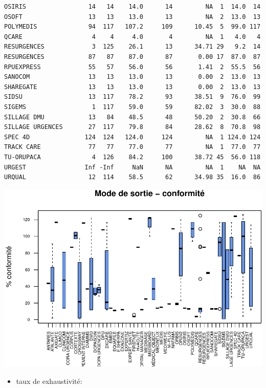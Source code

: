 \documentclass[]{article}
\begin{document}
\begin{verbatim}
OSIRIS                 14   14    14.0      14         NA  1  14.0  14
OSOFT                  13   13    13.0      13         NA  2  13.0  13
POLYMEDIS              94  117   107.2     109      10.45  5  99.0 117
QCARE                   4    4     4.0       4         NA  1   4.0   4
RESURGENCES             3  125    26.1      13      34.71 29   9.2  14
RESURGENCES            87   87    87.0      87       0.00 17  87.0  87
RPUEXPRESS             55   57    56.0      56       1.41  2  55.5  56
SANOCOM                13   13    13.0      13       0.00  2  13.0  13
SHAREGATE              13   13    13.0      13       0.00  2  13.0  13
SIDSU                  13  117    78.2      93      38.51  9  76.0  99
SIGEMS                  1  117    59.0      59      82.02  3  30.0  88
SILLAGE DMU            13   84    48.5      48      50.20  2  30.8  66
SILLAGE URGENCES       27  117    79.8      84      28.62  8  70.8  98
SPEC 4D               124  124   124.0     124         NA  1 124.0 124
TRACK CARE             77   77    77.0      77         NA  1  77.0  77
TU-ORUPACA              4  126    84.2     100      38.72 45  56.0 118
URGEST                Inf -Inf     NaN      NA         NA  1    NA  NA
URQUAL                 12  114    58.5      62      34.98 35  16.0  86
\end{verbatim}

\includegraphics{septembre2015_files/figure-latex/unnamed-chunk-26-1.pdf}

\begin{itemize}
\itemsep1pt\parskip0pt
\item
  taux de exhaustivité:
\end{itemize}
\end{document}
